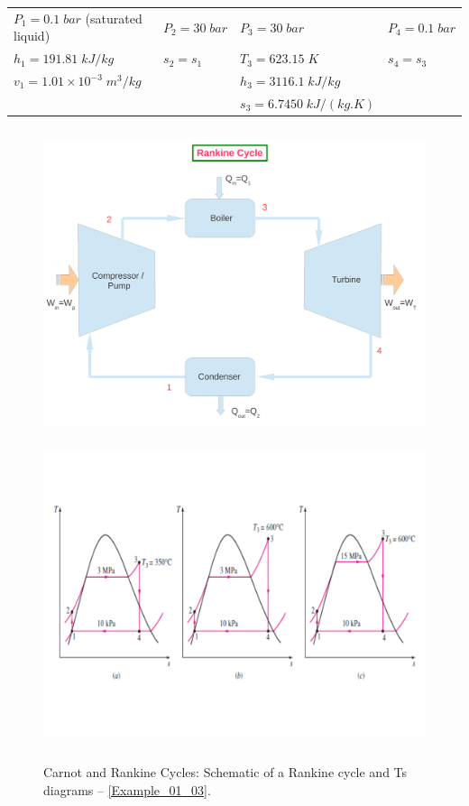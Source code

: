 \documentclass[12pts,a4paper,amsmath,amssymb,floatfix]{article}%
\begin{document}
\begin{enumerate}[label=\bfseries Example \arabic*]
\begin{enumerate}
\begin{tabular}{l l l l}
$P_{1}=0.1\;bar$ (saturated liquid) &  $P_{2}=30\;bar$ & $P_{3}=30\;bar$           & $P_{4}=0.1\;bar$ \\
$h_{1}=191.81\;kJ/kg$               &  $s_{2}=s_{1}$   & $T_{3}=623.15\;K$         & $s_{4}=s_{3}$ \\
$v_{1}=1.01\times 10^{-3}\;m^{3}/kg$ &                  & $h_{3}=3116.1\;kJ/kg$     &                 \\
                                    &                 & $s_{3}=6.7450\;kJ/(kg.K)$ &                 \\
\end{tabular}


\begin{figure}[h]
\begin{center}
\vbox{
\includegraphics[width=13.0cm,height=9.0cm]{./../../ThermalEngines/Pics/Simple_Rankine_Cycle_2}
\vspace{-1.cm}
\includegraphics[width=15.0cm,height=9.0cm]{./../../ThermalEngines/Pics/example01_03}
}
\end{center}
\caption{Carnot and Rankine Cycles: Schematic of a Rankine cycle and Ts diagrams -- \ref{Example_01_03}.}
\label{Example01_01:Pic3}
\end{figure}


\end{enumerate}
\end{enumerate}
\end{document}
